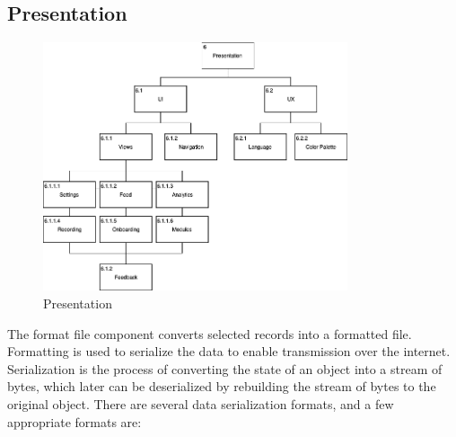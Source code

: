 \subsection{Presentation}
\begin{figure}
    \centering
    \includegraphics[width=0.8\textwidth]{images/Presentation.png}
    \caption{Presentation}
    \label{fig:hta_presentation}
\end{figure}
The format file component converts selected records into a formatted file. Formatting is used to serialize the data to enable transmission over the internet. Serialization is the process of converting the state of an object into a stream of bytes, which later can be deserialized by rebuilding the stream of bytes to the original object. There are several data serialization formats, and a few appropriate formats are:
